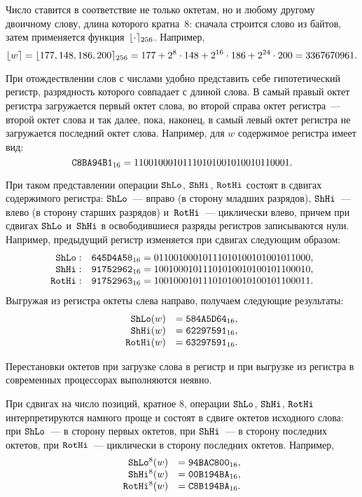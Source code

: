 Число ставится в соответствие не только октетам, но и любому другому
двоичному слову, длина которого кратна~$8$:
сначала строится слово из байтов, затем применяется функция~$\lfloor\cdot\rceil_{256}$.
%
Например, 
$$
\lfloor w\rceil=\lfloor177,148,186,200\rceil_{256}=177+2^{8}\cdot 148+2^{16}\cdot 
186+2^{24}\cdot 200 = 3367670961. 
$$

При отождествлении слов с числами удобно представить себе 
гипотетический регистр, разрядность которого совпадает с длиной слова.
В самый правый октет регистра загружается первый октет слова, 
во второй справа октет регистра~--- второй октет слова и так далее,
пока, наконец, в самый левый октет регистра не загружается последний 
октет слова.
%
Например, для $w$ содержимое регистра имеет 
вид:
$$
\texttt{C8BA94B1}_{16}=
11001000 10111010 10010100 10110001.
$$

При таком представлении операции $\mathop{\texttt{ShLo}}\nolimits$, $\mathop{\texttt{ShHi}}\nolimits$, $\mathop{\texttt{RotHi}}\nolimits$ состоят в
сдвигах содержимого регистра: 
$\mathop{\texttt{ShLo}}\nolimits$~--- вправо (в сторону младших разрядов),
$\mathop{\texttt{ShHi}}\nolimits$~--- влево (в сторону старших разрядов)
и~$\mathop{\texttt{RotHi}}\nolimits$~--- циклически влево,
причем при сдвигах $\mathop{\texttt{ShLo}}\nolimits$ и~$\mathop{\texttt{ShHi}}\nolimits$ в освободившиеся разряды 
регистров записываются нули.
%
Например, предыдущий регистр изменяется при сдвигах следующим образом:
$$      
\begin{array}{rl}
\mathop{\texttt{ShLo}}\nolimits: &\texttt{645D4A58}_{16}=
0 1100100 0 1011101 0 1001010 0 1011000,\\
\mathop{\texttt{ShHi}}\nolimits: &\texttt{91752962}_{16}= 
1001000 1 0111010 1 0010100 1 0110001 0,\\
\mathop{\texttt{RotHi}}\nolimits: &\texttt{91752963}_{16}=
1001000 1 0111010 1 0010100 1 0110001 1.
\end{array}
$$
Выгружая из регистра октеты слева направо, 
получаем следующие результаты:
$$
\begin{array}{rl}
\mathop{\texttt{ShLo}}\nolimits(w)&=  \texttt{584A5D64}_{16},\\
\mathop{\texttt{ShHi}}\nolimits(w)&=  \texttt{62297591}_{16},\\
\mathop{\texttt{RotHi}}\nolimits(w)&= \texttt{63297591}_{16}.
\end{array}
$$

Перестановки октетов при загрузке слова в регистр и при выгрузке из 
регистра в современных процессорах выполняются неявно.

При сдвигах на число позиций, кратное $8$, операции $\mathop{\texttt{ShLo}}\nolimits$, $\mathop{\texttt{ShHi}}\nolimits$, $\mathop{\texttt{RotHi}}\nolimits$
интерпретируются намного проще и состоят в сдвиге октетов исходного слова: 
при $\mathop{\texttt{ShLo}}\nolimits$~--- в сторону первых октетов, 
при $\mathop{\texttt{ShHi}}\nolimits$~--- в сторону последних октетов,
при $\mathop{\texttt{RotHi}}\nolimits$~--- циклически в сторону последних октетов.
Например,
$$
\begin{array}{rl}
\mathop{\texttt{ShLo}}\nolimits^8(w)&=  \texttt{94BAC800}_{16},\\
\mathop{\texttt{ShHi}}\nolimits^8(w)&=  \texttt{00B194BA}_{16},\\
\mathop{\texttt{RotHi}}\nolimits^8(w)&= \texttt{C8B194BA}_{16}.
\end{array}
$$

